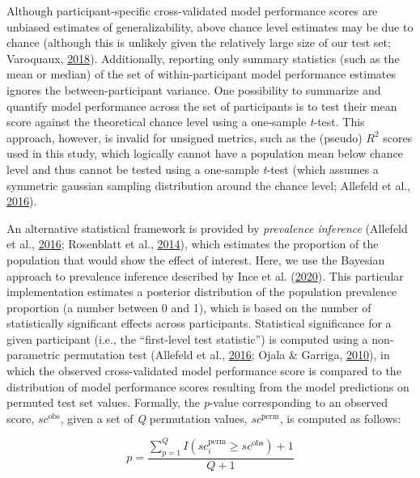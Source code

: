 \documentclass[12pt,american,a4paper,oneside,]{memoir} %
\begin{document}
Although participant-specific cross-validated model performance scores are unbiased estimates of generalizability, above chance level estimates may be due to chance (although this is unlikely given the relatively large size of our test set; Varoquaux, \protect\hyperlink{ref-Varoquaux2018-uo}{2018}). Additionally, reporting only summary statistics (such as the mean or median) of the set of within-participant model performance estimates ignores the between-participant variance. One possibility to summarize and quantify model performance across the set of participants is to test their mean score against the theoretical chance level using a one-sample \emph{t}-test. This approach, however, is invalid for unsigned metrics, such as the (pseudo) \(R^{2}\) scores used in this study, which logically cannot have a population mean below chance level and thus cannot be tested using a one-sample \emph{t}-test (which assumes a symmetric gaussian sampling distribution around the chance level; Allefeld et al., \protect\hyperlink{ref-Allefeld2016-xp}{2016}).

An alternative statistical framework is provided by \emph{prevalence inference} (Allefeld et al., \protect\hyperlink{ref-Allefeld2016-xp}{2016}; Rosenblatt et al., \protect\hyperlink{ref-Rosenblatt2014-az}{2014}), which estimates the proportion of the population that would show the effect of interest. Here, we use the Bayesian approach to prevalence inference described by Ince et al. (\protect\hyperlink{ref-Ince2020-mr}{2020}). This particular implementation estimates a posterior distribution of the population prevalence proportion (a number between 0 and 1), which is based on the number of statistically significant effects across participants. Statistical significance for a given participant (i.e., the ``first-level test statistic'') is computed using a non-parametric permutation test (Allefeld et al., \protect\hyperlink{ref-Allefeld2016-xp}{2016}; Ojala \& Garriga, \protect\hyperlink{ref-Ojala2010-rc}{2010}), in which the observed cross-validated model performance score is compared to the distribution of model performance scores resulting from the model predictions on permuted test set values. Formally, the \emph{p}-value corresponding to an observed score, \(sc^{\mathrm{obs}}\), given a set of \emph{Q} permutation values, \(sc^{\mathrm{perm}}\), is computed as follows:

\begin{equation}
p = \frac{\sum_{p=1}^{Q} I(sc_{i}^{\mathrm{perm}} \geq sc^{\mathrm{obs}}) + 1}{Q + 1}
\end{equation}
\end{document}
